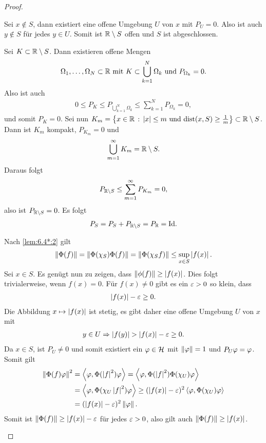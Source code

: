 \begin{proof}
\begin{proofenum}
\item Sei $x\notin S$, dann existiert eine offene Umgebung $U$ von $x$ mit $P_U
= 0$. Also ist auch $y\notin S$ für jedes $y\in U$. Somit ist $\mathbb{R}\setminus S$
offen und $S$ ist abgeschlossen.
\item Sei $K\subset\mathbb{R}\setminus S$. Dann existieren offene Mengen
\begin{align*}
\Omega_1,\ldots,\Omega_N \subset \mathbb{R}
\text{ mit }
K \subset \bigcup_{k=1}^N \Omega_k\text{ und }P_{\Omega_k} = 0. 
\end{align*}
Also ist auch
\begin{align*}
0\le P_{K} \le P_{\bigcup_{k=1}^N \Omega_k} \le \sum_{k=1}^N P_{\Omega_k} = 0, 
\end{align*}
und somit $P_K=0$. Sei nun $K_m = \left\{ x\in\mathbb{R}\,:\,\left|x\right|\le m\text{ und
}\mathrm{dist}(x,S)\ge \frac{1}{m}\right\}\subset \mathbb{R}\setminus S$. Dann ist $K_m$ kompakt,
$P_{K_m} = 0$ und
\begin{align*}
\bigcup_{m=1}^\infty K_m = \mathbb{R}\setminus S. 
\end{align*}
Daraus folgt
\begin{align*}
P_{\mathbb{R}\setminus S} \le \sum_{m=1}^\infty P_{K_m} = 0,
\end{align*}
also ist $P_{\mathbb{R}\setminus S} =0$. Es folgt
\begin{align*}
P_S = P_S + P_{\mathbb{R}\setminus S} = P_{\mathbb{R}} = \mathrm{Id}.
\end{align*}
\item Nach \ref{lem:6.4*:2} gilt
\begin{align*}
\left\|\Phi(f)\right\| = \left\|\Phi(\chi_S)\Phi(f)\right\| = \left\|\Phi(\chi_S f)\right\| \le
\sup_{x\in S}\left|f(x)\right|.
\end{align*}
Sei $x\in S$. Es genügt nun zu zeigen, dass $\left\|\phi(f)\right\| \ge \left|f(x)\right|$.
Dies folgt trivialerweise, wenn $f(x) = 0$. Für $f(x)\neq 0$ gibt es ein $\varepsilon >
0$ so klein, dass
\begin{align*}
\left|f(x)\right| - \varepsilon \ge 0.
\end{align*}
Die Abbildung $x\mapsto \left|f(x)\right|$ ist stetig, es gibt daher eine offene
Umgebung $U$ von $x$ mit
\begin{align*}
y\in U \Rightarrow \left|f(y)\right| > \left|f(x)\right| - \varepsilon \ge 0.
\end{align*}
Da $x\in S$, ist $P_U \neq 0$ und somit existiert ein $\varphi\in\mathcal{H}$ mit
$\left\|\varphi\right\|=1$ und $P_U\varphi = \varphi$. Somit gilt
\begin{align*}
\left\|\Phi(f)\varphi\right\|^2 &= \left\langle\varphi,\Phi(\left|f\right|^2)\varphi\right\rangle
= \left\langle\varphi,\Phi(\left|f\right|^2)\Phi(\chi_U)\varphi\right\rangle\\
&= \left\langle\varphi,\Phi(\chi_U \left|f\right|^2)\varphi\right\rangle
\ge (\left|f(x)\right|-\varepsilon)^2 \left\langle\varphi,\Phi(\chi_U)\varphi\right\rangle\\
&= (\left|f(x)\right|-\varepsilon)^2 \left\|\varphi\right\|. 
\end{align*}
Somit ist $\left\|\Phi(f)\right\| \ge \left|f(x)\right|-\varepsilon$ für jedes $\varepsilon > 0$, also gilt
auch $\left\|\Phi(f)\right\| \ge \left|f(x)\right|$.\qedhere
\end{proofenum}
\end{proof}

